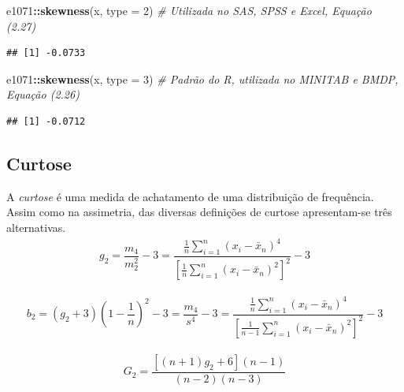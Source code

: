 \documentclass[
]{book}
\newenvironment{Shaded}{\begin{snugshade}}{\end{snugshade}}
\newcommand{\CommentTok}[1]{\textcolor[rgb]{0.56,0.35,0.01}{\textit{#1}}}
\newcommand{\DataTypeTok}[1]{\textcolor[rgb]{0.13,0.29,0.53}{#1}}
\newcommand{\DecValTok}[1]{\textcolor[rgb]{0.00,0.00,0.81}{#1}}
\newcommand{\KeywordTok}[1]{\textcolor[rgb]{0.13,0.29,0.53}{\textbf{#1}}}
\newcommand{\NormalTok}[1]{#1}
\newcommand{\OperatorTok}[1]{\textcolor[rgb]{0.81,0.36,0.00}{\textbf{#1}}}
\theoremstyle{definition}
\theoremstyle{definition}
\theoremstyle{definition}
\theoremstyle{remark}
\begin{document}
\begin{Shaded}
\begin{Highlighting}[]
\NormalTok{e1071}\OperatorTok{::}\KeywordTok{skewness}\NormalTok{(x, }\DataTypeTok{type =} \DecValTok{2}\NormalTok{)    }\CommentTok{\# Utilizada no SAS, SPSS e Excel, Equação (2.27)}
\end{Highlighting}
\end{Shaded}

\begin{verbatim}
## [1] -0.0733
\end{verbatim}

\begin{Shaded}
\begin{Highlighting}[]
\NormalTok{e1071}\OperatorTok{::}\KeywordTok{skewness}\NormalTok{(x, }\DataTypeTok{type =} \DecValTok{3}\NormalTok{)    }\CommentTok{\# Padrão do R, utilizada no MINITAB e BMDP, Equação (2.26)}
\end{Highlighting}
\end{Shaded}

\begin{verbatim}
## [1] -0.0712
\end{verbatim}

\hypertarget{curtose}{%
\subsection{Curtose}\label{curtose}}

A \emph{curtose} é uma medida de achatamento de uma distribuição de frequência. Assim como na assimetria, das diversas definições de curtose apresentam-se três alternativas.
\begin{eqnarray}
g_2 = \dfrac{m_4}{m_2^{2}} - 3 = \dfrac{\frac{1}{n} \sum_{i=1}^{n} (x_{i} - \bar{x}_n)^4}{\left[ \frac{1}{n} \sum_{i=1}^{n} (x_{i} - \bar{x}_n)^2 \right]^{2}} - 3
\label{eq:cur1}
\end{eqnarray}

\begin{eqnarray}
b_2 = (g_2 + 3) \left( 1 - \dfrac{1}{n} \right)^{2} - 3 = \dfrac{m_4}{s^4} - 3 = \dfrac{\frac{1}{n} \sum_{i=1}^{n} (x_{i} - \bar{x}_n)^4 }{\left[ \frac{1}{n-1} \sum_{i=1}^{n} (x_{i} - \bar{x}_n)^2 \right]^{2}} - 3
\label{eq:cur3}
\end{eqnarray}

\begin{eqnarray}
G_2 = \dfrac{ \left[ (n+1) g_2 + 6 \right] (n-1)}{(n-2)(n-3)}
\label{eq:cur2}
\end{eqnarray}
\end{document}
